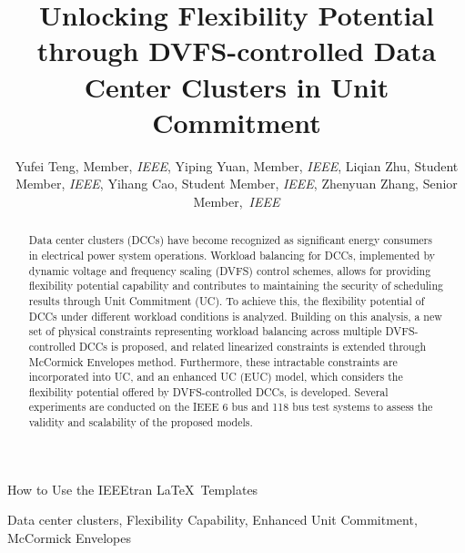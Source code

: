 \documentclass[lettersize,journal]{IEEEtran}
\begin{document}
\title{\fontsize{20pt}{24pt}\selectfont Unlocking Flexibility Potential through DVFS-controlled Data Center Clusters in Unit Commitment}
\author{Yufei Teng, Member, \textit{IEEE}, Yiping Yuan, Member, \textit{IEEE}, Liqian Zhu, Student Member, \textit{IEEE}, Yihang Cao, Student Member, \textit{IEEE}, Zhenyuan Zhang, Senior Member,~\textit{IEEE}}

\IEEEaftertitletext{\vspace{-1.0\baselineskip}}

%
{How to Use the IEEEtran \LaTeX \ Templates}

\maketitle

\begin{abstract}
  Data center clusters (DCCs) have become recognized as significant energy consumers in electrical power system operations. Workload balancing for DCCs, implemented by dynamic voltage and frequency scaling (DVFS) control schemes, allows for providing flexibility potential capability and contributes to maintaining the security of scheduling results through Unit Commitment (UC).
  To achieve this, the flexibility potential of DCCs under different workload conditions is analyzed. Building on this analysis, a new set of physical constraints representing workload balancing across multiple DVFS-controlled DCCs is proposed, and related linearized constraints is extended through McCormick Envelopes method. Furthermore, these intractable constraints are incorporated into UC, and an enhanced UC (EUC) model, which considers the flexibility potential offered by DVFS-controlled DCCs, is developed. Several experiments are conducted on the IEEE 6 bus and 118 bus test systems to assess the validity and scalability of the proposed models.

\end{abstract}

\begin{IEEEkeywords}
  Data center clusters, Flexibility Capability, Enhanced Unit Commitment, McCormick Envelopes
\end{IEEEkeywords}

\vspace{-0.5cm}
\end{document}
